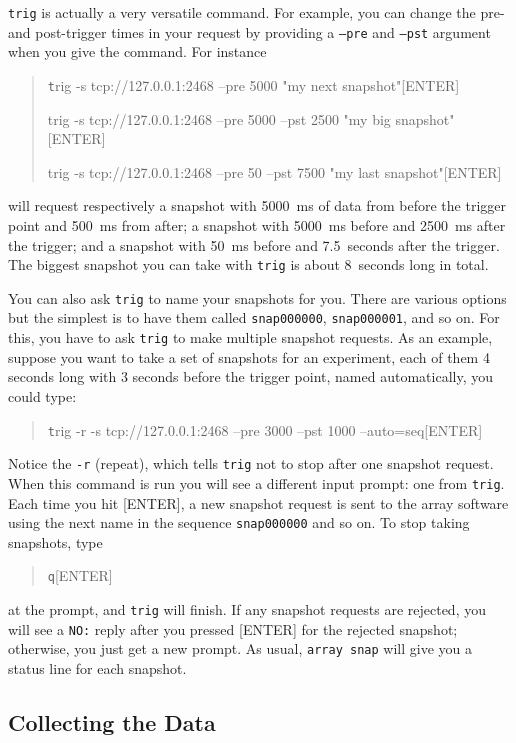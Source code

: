 \documentclass[12pt]{article}
\begin{document}
\texttt{trig} is actually a very versatile command.  For example, you
can change the pre- and post-trigger times in your request by
providing a \texttt{--pre} and \texttt{--pst} argument when you give
the command.  For instance
\begin{quotation}\texttt
      trig -s tcp://127.0.0.1:2468 --pre 5000 "my next snapshot"[ENTER]

      trig -s tcp://127.0.0.1:2468 --pre 5000 --pst 2500 "my big snapshot"[ENTER]

      trig -s tcp://127.0.0.1:2468 --pre 50 --pst 7500 "my last snapshot"[ENTER]
\end{quotation}
will request respectively a snapshot with 5000~ms of data from before
the trigger point and 500~ms from after; a snapshot with 5000~ms
before and 2500~ms after the trigger; and a snapshot with 50~ms before
and 7.5~seconds after the trigger.  The biggest snapshot you can take
with \texttt{trig} is about 8~seconds long in total.

You can also ask \texttt{trig} to name your snapshots for you.  There are
various options but the simplest is to have them called
\texttt{snap000000}, \texttt{snap000001}, and so on.  For this, you
have to ask \texttt{trig} to make multiple snapshot requests.  As an example,
suppose you want to take a set of snapshots for an experiment, each of
them 4 seconds long with 3 seconds before the trigger point, named
automatically, you could type:
\begin{quotation}\texttt
      trig -r -s tcp://127.0.0.1:2468 --pre 3000 --pst 1000 --auto=seq[ENTER]
\end{quotation}
Notice the \texttt{-r} (repeat), which tells \texttt{trig} not to stop after one
snapshot request.  When this command is run you will see a different
input prompt: one from \texttt{trig}.  Each time you hit [ENTER], a
new snapshot request is sent to the array software using the next name
in the sequence \texttt{snap000000} and so on.  To stop taking
snapshots, type
\begin{quotation}\texttt
      q[ENTER]
\end{quotation}
at the prompt, and \texttt{trig} will finish.  If any snapshot requests are
rejected, you will see a \texttt{NO:} reply after you pressed [ENTER]
for the rejected snapshot; otherwise, you just get a new prompt.  As usual,
\texttt{array snap} will give you a status line for each snapshot.

\subsection{Collecting the Data}
\end{document}
